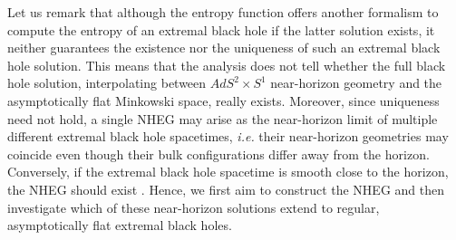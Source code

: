 \documentclass[11pt]{article}
\numberwithin{equation}{section} %
\begin{document}
Let us remark that although the entropy function offers another formalism to compute the entropy of an extremal black hole if the latter solution exists, it neither guarantees the existence nor the uniqueness  of   such an extremal black hole  solution. This means that the analysis does not tell whether the full black hole solution, interpolating between $AdS^2 \times S^1$ near-horizon geometry and the asymptotically flat Minkowski space, really exists.  Moreover, since uniqueness need not hold, a single NHEG may   arise as the near-horizon limit of multiple different extremal black hole spacetimes, \emph{i.e.} their near-horizon geometries may coincide even though their bulk configurations differ away from the horizon. Conversely, if the extremal black hole  spacetime  is smooth close to the horizon, the NHEG should exist  {\cite{Kunduri:2007vf,Kunduri:2013gce}}. Hence, we first aim to construct the NHEG and then investigate which of these near-horizon solutions extend to regular, asymptotically flat extremal black holes.
\end{document}
